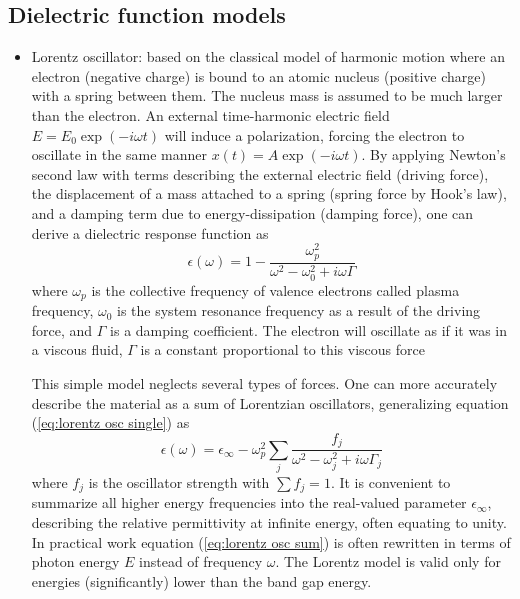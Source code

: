 \subsection{Dielectric function models}
\begin{itemize}
    \item Lorentz oscillator: based on the classical model of harmonic motion where an electron (negative charge) is bound to an atomic nucleus (positive charge) with a spring between them. The nucleus mass is assumed to be much larger than the electron. An external time-harmonic electric field $E = E_0 \exp(-i\omega t)$ will induce a polarization, forcing the electron to oscillate in the same manner $x(t) = A \exp(-i\omega t)$. By applying Newton's second law with terms describing the external electric field (driving force), the displacement of a mass attached to a spring (spring force by  Hook's law), and a damping term due to energy-dissipation (damping force), one can derive a dielectric response function as
    \begin{equation}
        \epsilon(\omega) = 1 - \frac{\omega_p^2}{\omega^2-\omega_0^2+i\omega\Gamma}
        \label{eq:lorentz osc single}
    \end{equation}
    where $\omega_p$ is the collective frequency of valence electrons called plasma frequency, $\omega_0$ is the system resonance frequency as a result of the driving force, and $\Gamma$ is a damping coefficient. The electron will oscillate as if it was in a viscous fluid, $\Gamma$ is a constant proportional to this viscous force 
    
    This simple model neglects several types of forces. One can more accurately describe the material as a sum of Lorentzian oscillators, generalizing equation (\ref{eq:lorentz osc single}) as
    \begin{equation}
        \epsilon(\omega) = \epsilon_\infty - \omega_p^2\sum_{j}\frac{f_j}{\omega^2-\omega_j^2+i\omega\Gamma_j}
        \label{eq:lorentz osc sum}
    \end{equation}
    where $f_j$ is the oscillator strength with $\sum f_j = 1$. It is convenient to summarize all higher energy frequencies into the real-valued parameter $\epsilon_\infty$, describing the relative permittivity at infinite energy, often equating to unity. In practical work equation (\ref{eq:lorentz osc sum}) is often rewritten in terms of photon energy $E$ instead of frequency $\omega$. The Lorentz model is valid only for energies (significantly) lower than the band gap energy. 
    

\end{itemize}
